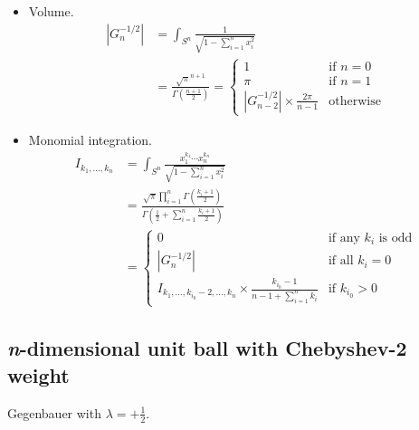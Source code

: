 \documentclass[draft]{scrartcl}
\begin{document}
\begin{itemize}
  \item Volume.
    \begin{align}\nonumber
    |G_n^{-1/2}|
      &= \int_{S^n} \frac{1}{\sqrt{1 - \sum_{i=1}^n x_i^2}}\\
      &= \frac{
        \sqrt{\pi}^{n+1}
      }{
        \Gamma\left(\frac{n+1}{2}\right)
      }
      =\begin{cases}
        1&\text{if $n=0$}\\
        \pi&\text{if $n=1$}\\
        |G_{n-2}^{-1/2}| \times \frac{2\pi}{n-1}&\text{otherwise}
      \end{cases}
    \end{align}

  \item Monomial integration.
    \begin{align}\nonumber
    I_{k_1,\dots,k_n}
      &= \int_{S^n} \frac{x_1^{k_1}\cdots x_n^{k_n}}{\sqrt{1 - \sum_{i=1}^n x_i^2}}\\
      &= \frac{
        \sqrt{\pi} \prod_{i=1}^n \Gamma\left(\frac{k_i+1}{2}\right)
      }{
        \Gamma\left(\frac{1}{2} + \sum_{i=1}^n \frac{k_i+1}{2}\right)
      }\\
      &= \begin{cases}
        0&\text{if any $k_i$ is odd}\\
        |G_n^{-1/2}|&\text{if all $k_i=0$}\\
        I_{k_1,\dots,k_{i_0}-2,\dots,k_n} \times \frac{k_{i_0}-1}{n-1 + \sum_{i=1}^n k_i}&\text{if $k_{i_0} > 0$}
      \end{cases}
    \end{align}
\end{itemize}


\subsection*{\textit{n}-dimensional unit ball with Chebyshev-2 weight}
Gegenbauer with $\lambda = +\frac{1}{2}.$
\end{document}
